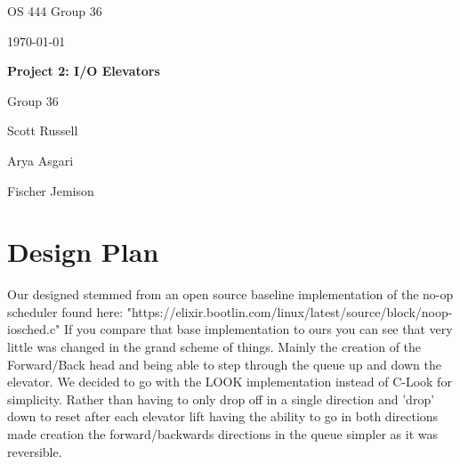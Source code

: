 \documentclass[onecolumn, draftclsnofoot,10pt, compsoc]{IEEEtran}
\def \GroupMemberOne{			Scott Russell}
\def \GroupMemberTwo{			Arya Asgari}
\def \GroupMemberThree{			Fischer Jemison}
\def \CapstoneProjectName{Project 2: I/O Elevators  }
\def \DocType{	
				}
\begin{document}
\begin{titlepage}
    \begin{singlespace}
        \hfill 
        \par\vspace{.2in}
        \centering
        \scshape{
            \huge OS 444 Group 36 \DocType \par
            {\large\today}\par
            \vspace{.5in}
            \textbf{\Huge\CapstoneProjectName}\par
          
           \vfill
            
          
            \vspace{5pt}
       
            {\large Group 36 }\par
    
         \vspace{5pt}
            {\Large
                \par{\GroupMemberOne}\par
               {\GroupMemberTwo}\par
               {\GroupMemberThree}\par
            }
            \vspace{20pt}
    
            

            \vspace{5pt}
        }     
    \end{singlespace}
\end{titlepage}
\newpage
{}
\tableofcontents
\clearpage


\section{Design Plan}
Our designed stemmed from an open source baseline implementation of the no-op scheduler found here: "https://elixir.bootlin.com/linux/latest/source/block/noop-iosched.c" If you compare that base implementation to ours you can see that very little was changed in the grand scheme of things. Mainly the creation of the Forward/Back head and being able to step through the queue up and down the elevator. We decided to go with the LOOK implementation instead of C-Look for simplicity. Rather than having to only drop off in a single direction and 'drop' down to reset after each elevator lift having the ability to go in both directions made creation the forward/backwards directions in the queue simpler as it was reversible.
\end{document}
